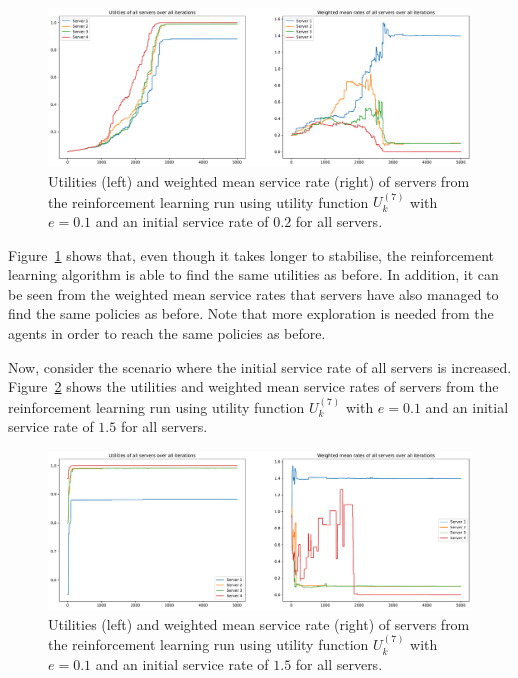 \begin{figure}[H]
    \includegraphics[width=\textwidth]{chapters/06_agent_based_extension/Bin/reinforcement_learning_results/utility_7/u7_4_e01_initial_02.pdf}
    \caption{Utilities (left) and weighted mean service rate (right) of servers
    from the reinforcement learning run using utility function \(U_k^{(7)}\)
    with \(e = 0.1\) and an initial service rate of \(0.2\) for all servers.}
    \label{fig:RL_utility7_4_e01_initial_02}
\end{figure}

Figure~\ref{fig:RL_utility7_4_e01_initial_02} shows that, even though it takes
longer to stabilise, the reinforcement learning algorithm is able to find the
same utilities as before.
In addition, it can be seen from the weighted mean service rates that servers
have also managed to find the same policies as before.
Note that more exploration is needed from the agents in order to reach the
same policies as before.

Now, consider the scenario where the initial service rate of all servers is
increased.
Figure~\ref{fig:RL_utility7_4_e01_initial_15} shows the utilities and weighted
mean service rates of servers from the reinforcement learning run using utility
function \(U_k^{(7)}\) with \(e = 0.1\) and an initial service rate of
\(1.5\) for all servers.

\begin{figure}[H]
    \includegraphics[width=\textwidth]{chapters/06_agent_based_extension/Bin/reinforcement_learning_results/utility_7/u7_4_e01_initial_15.pdf}
    \caption{Utilities (left) and weighted mean service rate (right) of servers
    from the reinforcement learning run using utility function \(U_k^{(7)}\)
    with \(e = 0.1\) and an initial service rate of \(1.5\) for all servers.}
    \label{fig:RL_utility7_4_e01_initial_15}
\end{figure}





